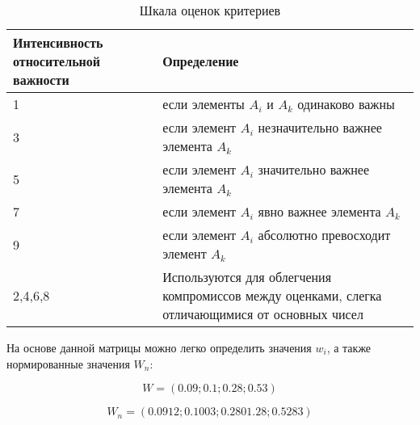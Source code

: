 
  \begin{table}
    \caption{Шкала оценок критериев}\label{crit_scale}
    \begin{tabular}{|p|p|}
    \hline Интенсивность относительной важности & Определение \\ [0.5ex] 
    \hline 1 & если элементы $A_i$ и $A_k$ одинаково важны \\
    \hline 3 & если элемент $A_i$ незначительно важнее элемента $A_k$ \\
    \hline 5 & если элемент $A_i$ значительно важнее элемента $A_k$ \\
    \hline 7 & если элемент $A_i$ явно важнее элемента $A_k$ \\
    \hline 9 & если элемент $A_i$ абсолютно превосходит элемент $A_k$ \\
    \hline 2,4,6,8 & Используются для облегчения компромиссов между оценками, слегка отличающимися от основных чисел \\ [0.5ex] 
    \hline
    \end{tabular}
  \end{table}

На основе данной матрицы можно легко определить значения $w_i$, а также нормированные значения $W_n$:

\begin{equation}
    W=(0.09;0.1;0.28;0.53)
\end{equation}

\begin{equation}
    W_n=(0.0912;0.1003;0.2801.28;0.5283)
\end{equation}

